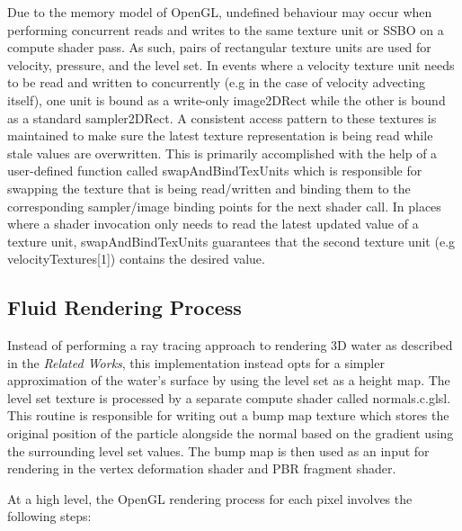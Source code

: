 \documentclass[conference]{IEEEtran}
\begin{document}
Due to the memory model of OpenGL, undefined behaviour may occur when performing concurrent reads and writes to the same texture unit or SSBO on a compute shader pass. As such, pairs of rectangular texture units are used for velocity, pressure, and the level set. In events where a velocity texture unit needs to be read and written to concurrently (e.g in the case of velocity advecting itself), one unit is bound as a write-only image2DRect while the other is bound as a standard sampler2DRect. A consistent access pattern to these textures is maintained to make sure the latest texture representation is being read while stale values are overwritten. This is primarily accomplished with the help of a user-defined function called swapAndBindTexUnits which is responsible for swapping the texture that is being read/written and binding them to the corresponding sampler/image binding points for the next shader call. In places where a shader invocation only needs to read the latest updated value of a texture unit, swapAndBindTexUnits guarantees that the second texture unit (e.g velocityTextures[1]) contains the desired value.


\subsection{Fluid Rendering Process}
Instead of performing a ray tracing approach to rendering 3D water as described in the \textit{Related Works}, this implementation instead opts for a simpler approximation of the water's surface by using the level set as a height map. The level set texture is processed by a separate compute shader called normals.c.glsl. This routine is responsible for writing out a bump map texture which stores the original position of the particle alongside the normal based on the gradient using the surrounding level set values. The bump map is then used as an input for rendering in the vertex deformation shader and PBR fragment shader.

At a high level, the OpenGL rendering process for each pixel involves the following steps:
\end{document}
